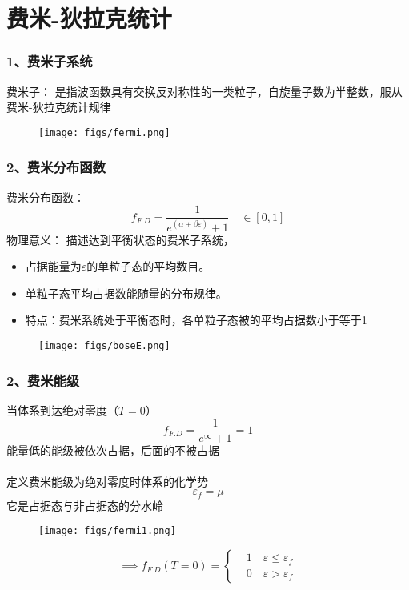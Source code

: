 \section{费米-狄拉克统计}

\begin{frame}
  \frametitle{ 1、费米子系统}

  \alert{费米子：} 是指波函数具有交换反对称性的一类粒子，自旋量子数为半整数，服从费米-狄拉克统计规律
   \begin{figure}[htbp]
    \centering
    \texttt{[image: figs/fermi.png]}
   \end{figure}
\end{frame} 

\begin{frame}
  \frametitle{ 2、费米分布函数}
  \begin{minipage}[b]{0.49\textwidth}
  \alert{费米分布函数：} 
  \[f_{F.D} =  \frac{1}{e^{(\alpha +\beta \varepsilon)}+1} \quad \in \left[0,1 \right]\]
    \alert{物理意义：} 描述达到平衡状态的费米子系统，
    \begin{itemize}
      \item 占据能量为$\varepsilon$的单粒子态的平均数目。
      \item 单粒子态平均占据数能随量的分布规律。
      \item 特点：费米系统处于平衡态时，各单粒子态被的平均占据数小于等于1
    \end{itemize}
    \end{minipage} 
    \begin{minipage}[b]{0.49\textwidth}
      \begin{figure}[htbp]
        \centering
        \texttt{[image: figs/boseE.png]}
      \end{figure}
      \end{minipage}
\end{frame}  

\begin{frame}
  \frametitle{ 2、费米能级}
\begin{minipage}[b]{0.49\textwidth}
当体系到达绝对零度（$T=0$）
$$f_{F.D} =  \frac{1}{e^{\infty}+1} = 1$$
能量低的能级被依次占据，后面的不被占据\\
~~\\ 
定义费米能级为绝对零度时体系的化学势
$$\varepsilon_f = \mu $$
它是占据态与非占据态的分水岭 
\end{minipage}
\begin{minipage}[b]{0.49\textwidth}
  \begin{figure}
    \texttt{[image: figs/fermi1.png]}   
\end{figure}
\[ \implies \boxed{ f_{F.D}(T=0) = \left\{ \begin{aligned}
  & 1 \quad \varepsilon \le \varepsilon_f \\ 
  & 0 \quad \varepsilon > \varepsilon_f
\end{aligned}\right.} \]
\end{minipage}
\end{frame} 

